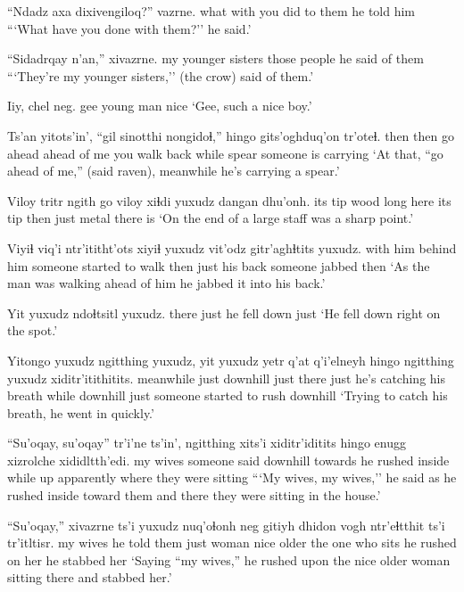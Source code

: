 \documentclass[12pt]{article}
\begin{document}
\gll ``Ndadz axa dixivengiloq?'' vazrne.
what with {you did to them} {he told him}
\glt ```What have you done with them?'' he said.'
\glend

\gll ``Sidadrqay n'an,'' xivazrne.
{my younger sisters} {those people} {he said of them}
\glt ```They're my younger sisters,'' (the crow) said of them.'
\glend

\gll Iiy, chel neg.
gee {young man} nice
\glt `Gee, such a nice boy.'
\glend

\gll Ts'an yitots'in', ``gil sinotthi nongidoɬ,'' hingo {gits'oghduq'on} tr'oteɬ.
then then {go ahead} {ahead of me} {you walk back} while spear {someone is carrying}
\glt `At that, ``go ahead of me,'' (said raven), meanwhile he's carrying a spear.'
\glend

\gll Viloy tritr ngith go viloy xiɬdi yuxudz dangan dhu'onh.
{its tip} wood long here {its tip} then just metal {there is}
\glt `On the end of a large staff was a sharp point.'
\glend

\gll Viyiɬ viq'i ntr'ititht'ots xiyiɬ yuxudz vit'odz gitr'aghɬtits yuxudz.
{with him} {behind him} {someone started to walk} then just {his back} {someone jabbed} then
\glt `As the man was walking ahead of him he jabbed it into his back.'
\glend

\gll Yit yuxudz ndoɬtsitl yuxudz.
there just {he fell down} just
\glt `He fell down right on the spot.'
\glend

\gll Yitongo yuxudz ngitthing yuxudz, yit yuxudz {yetr q'at q'i'elneyh} hingo ngitthing yuxudz xiditr'itithitits.
meanwhile just downhill just there just {he's catching his breath} while downhill just {someone started to rush downhill}
\glt `Trying to catch his breath, he went in quickly.'
\glend

\gll ``Su'oqay, su'oqay'' tr'i'ne ts'in', ngitthing xits'i xiditr'iditits hingo enugg xizrolche xididltth'edi.
{my wives} {} {someone said} {} downhill towards {he rushed inside} while up apparently {where they were sitting}
\glt ```My wives, my wives,'' he said as he rushed inside toward them and there they were sitting in the house.'
\glend

\gll ``Su'oqay,'' xivazrne ts'i yuxudz nuq'oɬonh neg gitiyh dhidon {vogh ntr'eɬtthit} ts'i tr'itltisr.
{my wives} {he told them} {} just woman nice older {the one who sits} {he rushed on her} {} {he stabbed her}
\glt `Saying ``my wives,'' he rushed upon the nice older woman sitting there and stabbed her.'
\glend
\end{document}
